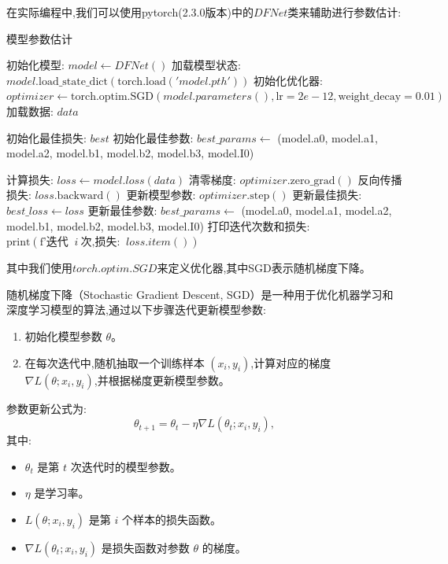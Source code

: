 在实际编程中,我们可以使用pytorch(2.3.0版本)中的$DFNet$类来辅助进行参数估计:
 \begin{algorithm}[H]
        \caption{模型参数估计}
        \begin{algorithmic}[1]
            \State 初始化模型: $model \leftarrow DFNet()$
            \State 加载模型状态: $model.\text{load\_state\_dict}(\text{torch.load}('model.pth'))$
            \State 初始化优化器: $optimizer \leftarrow \text{torch.optim.SGD}(model.parameters(), \text{lr}=2e-12, \text{weight\_decay}=0.01)$
            \State 加载数据: $data$
            
            \State 初始化最佳损失: $best$
            \State 初始化最佳参数: $best\_params \leftarrow$ (model.a0, model.a1, model.a2, model.b1, model.b2, model.b3, model.I0)
            
                \State 计算损失: $loss \leftarrow model.loss(data)$
                \State 清零梯度: $optimizer.\text{zero\_grad}()$
                \State 反向传播损失: $loss.\text{backward}()$
                \State 更新模型参数: $optimizer.\text{step}()$
                    \State 更新最佳损失: $best\_loss \leftarrow loss$
                    \State 更新最佳参数: $best\_params \leftarrow$ (model.a0, model.a1, model.a2, model.b1, model.b2, model.b3, model.I0)
                \EndIf
                \State 打印迭代次数和损失: $\text{print}(\text{f'迭代 } \ i \ \text{次,损失: } \ loss.item())$
            \EndFor
        \end{algorithmic}
    \end{algorithm}
 
    其中我们使用$torch.optim.SGD$来定义优化器,其中SGD表示随机梯度下降。

随机梯度下降（Stochastic Gradient Descent, SGD）是一种用于优化机器学习和深度学习模型的算法,通过以下步骤迭代更新模型参数:
\begin{enumerate}
    \item 初始化模型参数 $\theta$。
    \item 在每次迭代中,随机抽取一个训练样本 $(x_i, y_i)$,计算对应的梯度 $\nabla L(\theta; x_i, y_i)$,并根据梯度更新模型参数。
\end{enumerate}

参数更新公式为:
\begin{equation}
    \theta_{t+1} = \theta_t - \eta \nabla L(\theta_t; x_i, y_i),
\end{equation}
其中:
\begin{itemize}
    \item $\theta_t$ 是第 $t$ 次迭代时的模型参数。
    \item $\eta$ 是学习率。
    \item $L(\theta; x_i, y_i)$ 是第 $i$ 个样本的损失函数。
    \item $\nabla L(\theta_t; x_i, y_i)$ 是损失函数对参数 $\theta$ 的梯度。
\end{itemize}

